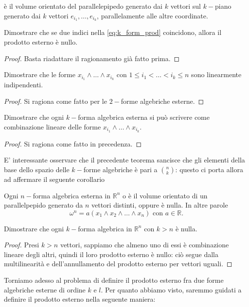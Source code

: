 è il volume orientato del parallelepipedo generato dai $k$ vettori sul $k-$piano generato dai $k$ vettori $e_{i_1}, \ldots, e_{i_k}$, parallelamente alle altre coordinate. \\
\begin{exercise}
    Dimostrare che se due indici nella \ref{eq:k_form_prod} coincidono, allora il prodotto esterno è nullo. 
\end{exercise}
\begin{proof}
    Basta riadattare il ragionamento già fatto prima.
\end{proof}
\begin{exercise}
    Dimostrare che le forme $x_{i_1} \wedge \ldots \wedge x_{i_k}$ con $1 \leq i_1 < \ldots < i_k \leq n$ sono linearmente indipendenti.
\end{exercise}
\begin{proof}
    Si ragiona come fatto per le $2-$forme algebriche esterne.
\end{proof}
\begin{exercise}
    Dimostrare che ogni $k-$forma algebrica esterna si può scrivere come combinazione lineare delle forme $x_{i_1} \wedge \ldots \wedge x_{i_k}$.
\end{exercise}
\begin{proof}
    Si ragiona come fatto in precedenza.
\end{proof}
E' interessante osservare che il precedente teorema sancisce che gli elementi della base dello spazio delle $k-$forme algebriche è pari a $\binom{n}{k}$: questo ci porta allora ad affermare il seguente corollario
\begin{cor}
    Ogni $n-$forma algebrica esterna in $\mathbb{R}^n$ o è il volume orientato di un parallelpepido generato da $n$ vettori distinti, oppure è nulla. In altre parole
    $$
        \omega^n = a (x_1 \wedge x_2 \wedge \ldots \wedge x_n) \text{ con } a \in \mathbb{R}.
    $$
\end{cor}
\begin{exercise}
    Dimostrare che ogni $k-$forma algebrica in $\mathbb{R}^n$ con $k > n$ è nulla.
\end{exercise}
\begin{proof}
    Presi $k > n$ vettori, sappiamo che almeno uno di essi è combinazione lineare degli altri, quindi il loro prodotto esterno è nullo: ciò segue dalla multilinearità e dell'annullamento del prodotto esterno per vettori uguali.
\end{proof}
Torniamo adesso al problema di definire il prodotto esterno fra due forme algebriche esterne di ordine $k$ e $l$. Per quanto abbiamo visto, saremmo guidati a definire il prodotto esterno nella seguente maniera:
